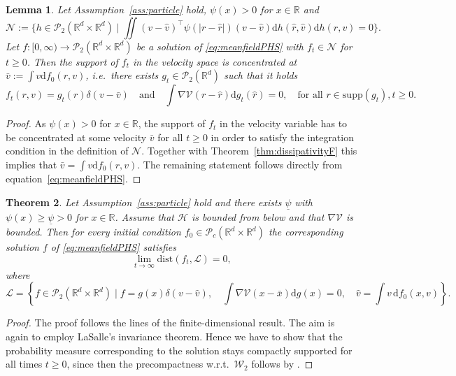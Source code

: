 \documentclass[11pt]{article}
\newtheorem{theorem}{Theorem}[section]
\newtheorem{lemma}[theorem]{Lemma}
\newcommand{\R}[0]{\mathbb R}
\newcommand{\calH}[0]{\mathcal H}
\newcommand{\calP}[0]{\mathcal P}
\newcommand{\calV}[0]{\mathcal V}
\newcommand{\dd}[0]{\mathrm d}
\newcommand{\V}[0]{\mathcal V}
\begin{document}
\begin{bibunit}[abbrv]
\begin{lemma}\label{lem:invariantMF}
Let Assumption~\ref{ass:particle} hold, $\psi(x) >0$ for $x \in\R$ and 
\[
\mathcal N := \{ h \in \calP_2(\R^d \times \R^d)  \mid \iint (v-\hat v)^\top \psi(|r-\hat r|) (v-\hat v) \dd h(\hat r, \hat v) \dd h(r,v) = 0 \}.
\]
Let $f \colon [0,\infty) \rightarrow  \calP_2(\R^d \times \R^d) $ be a solution of \eqref{eq:meanfieldPHS} with $f_t \in \mathcal N$ for $t\ge 0$. Then the support of $f_t$ in the velocity space is concentrated at  $\bar v:= \int v \dd f_0(r,v)$, i.e.~there exists $g_t \in \calP_2(\R^d)$ such that it holds
\[
f_t(r,v) = g_t(r)\delta(v-\bar v) \quad \text{and} \quad \int \nabla \V(r-\hat r) \dd g_t(\hat r) = 0, \quad \text{for all } r \in \mathrm{supp}(g_t), t \ge 0.  
\]
\end{lemma}
\begin{proof}
As $\psi(x)>0$ for $x\in \R$, the support of $f_t$ in the velocity variable has to be concentrated at some velocity $\bar v$ for all $t\ge 0$ in order to satisfy the integration condition in the definition of $\mathcal N$. Together with Theorem~\ref{thm:dissipativityF} this implies that $\bar v = \int v \dd f_0(r,v)$. The remaining statement follows directly from equation~\eqref{eq:meanfieldPHS}. 
\end{proof}


\begin{theorem}\label{prop:stabilityMF}
Let Assumption~\ref{ass:particle} hold and there exists $\underline{\psi}$ with $\psi(x) \ge \underline{\psi}>0$ for $x\in\R$. Assume that $\calH$ is bounded from below and that $\nabla \V$ is bounded. Then for every initial condition $f_0 \in \calP_c(\R^d \times \R^d)$ the corresponding solution $f$ of \eqref{eq:meanfieldPHS} satisfies
\[
\lim\limits_{t\rightarrow \infty}\mathrm{dist}(f_t, \mathcal L) =0,
\]
where
\[
\mathcal L = \left\{ f \in \calP_2(\R^d \times \R^d) \mid f=g(x)\delta(v-\hat v), \quad\int \nabla \calV(x-\bar x) \dd g(x) = 0,\quad \hat v = \int v\, \dd f_0(x,v) \right\}.
\]
\end{theorem}

\begin{proof}
 The proof follows the lines of the finite-dimensional result. The aim is again to employ LaSalle's invariance theorem. Hence we have to show that the probability measure corresponding to the solution stays compactly supported for all times $t\ge 0$, since then the precompactness w.r.t.~$\mathcal W_2$ follows by \cite[Proposition 2.2.3]{panaretos2020invitation}. 


\end{proof}
\end{bibunit}
\end{document}
